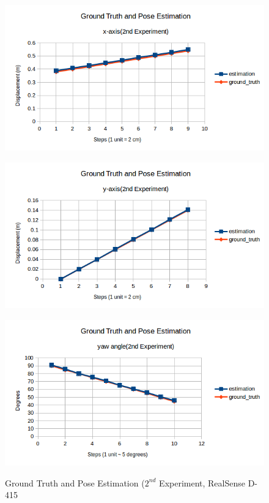 \begin{figure}[htp]
\begin{center}
{
  \includegraphics[clip,width=0.7\columnwidth]{figures/x_newrealsense.png}
}
\end{center}
\begin{center}
{
  \includegraphics[clip,width=0.7\columnwidth]{figures/y_newrealsense.png}
}
\end{center}

\begin{center}
{
  \includegraphics[clip,width=0.7\columnwidth]{figures/yaw_newrealsense.png}
}
\end{center}
\caption{Ground Truth and Pose Estimation ($2^{nd}$ Experiment, RealSense D-415}
\label{setupsystem1}
\end{figure}
